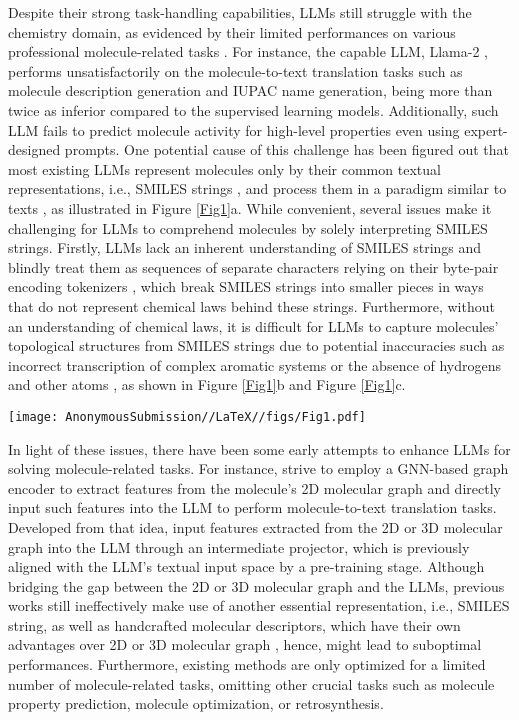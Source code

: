 Despite their strong task-handling capabilities, LLMs still struggle with the chemistry domain, as evidenced by their limited performances on various professional molecule-related tasks \cite{zhao2023scientific, guo2023can}. For instance, the capable LLM, Llama-2 \cite{touvron2023llama}, performs unsatisfactorily on the molecule-to-text translation tasks such as molecule description generation and IUPAC name generation, being more than twice as inferior compared to the supervised learning models. Additionally, such LLM fails to predict molecule activity for high-level properties even using expert-designed prompts. One potential cause of this challenge has been figured out that most existing LLMs represent molecules only by their common textual representations, i.e., SMILES strings \cite{weininger1988smiles}, and process them in a paradigm similar to texts \cite{guo2023can, li2023towards}, as illustrated in Figure \ref{Fig1}a. While convenient, several issues make it challenging for LLMs to comprehend molecules by solely interpreting SMILES strings. Firstly, LLMs lack an inherent understanding of SMILES strings and blindly treat them as sequences of separate characters relying on their byte-pair encoding tokenizers \cite{sennrich2016neural}, which break SMILES strings into smaller pieces in ways that do not represent chemical laws behind these strings. Furthermore, without an understanding of chemical laws, it is difficult for LLMs to capture molecules’ topological structures from SMILES strings due to potential inaccuracies such as incorrect transcription of complex aromatic systems or the absence of hydrogens and other atoms \cite{voinarovska2023yield}, as shown in Figure \ref{Fig1}b and Figure \ref{Fig1}c. 

\begin{figure*}[!ht]
    \centering
    \texttt{[image: AnonymousSubmission//LaTeX//figs/Fig1.pdf]}
    \caption{Current paradigm of using an LLM for molecule-related tasks and its issues.}
    \label{Fig1}
\end{figure*}

In light of these issues, there have been some early attempts to enhance LLMs for solving molecule-related tasks. For instance, \citet{su2022molecular} strive to employ a GNN-based graph encoder to extract features from the molecule’s 2D molecular graph and directly input such features into the LLM to perform molecule-to-text translation tasks. Developed from that idea, \citet{li2023towards} input features extracted from the 2D or 3D molecular graph into the LLM through an intermediate projector, which is previously aligned with the LLM’s textual input space by a pre-training stage. Although bridging the gap between the 2D or 3D molecular graph and the LLMs, previous works still ineffectively make use of another essential representation, i.e., SMILES string, as well as handcrafted molecular descriptors, which have their own advantages over 2D or 3D molecular graph \cite{david2020molecular, jo2020message}, hence, might lead to suboptimal performances. Furthermore, existing methods are only optimized for a limited number of molecule-related tasks, omitting other crucial tasks such as molecule property prediction, molecule optimization, or retrosynthesis. 

